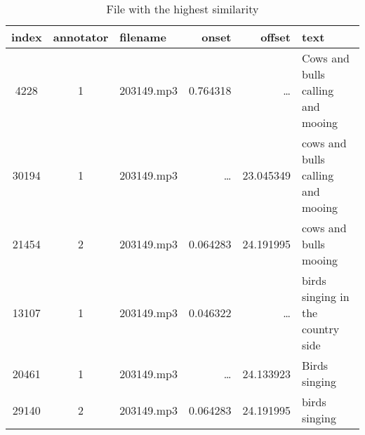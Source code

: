 \begin{table}[h]
  \caption{File with the highest similarity}
  \label{tab:highest similarity}
  \centering
  \begin{tabular}{cclrrp{6cm}}
    \toprule
    index & annotator & filename & onset & offset & text \\
    \midrule
    4228 & 1 & 203149.mp3 & 0.764318 & \dots & Cows and bulls calling and mooing \\
    30194 & 1 & 203149.mp3 & \dots & 23.045349 & cows and bulls calling and mooing \\
    21454 & 2 & 203149.mp3 & 0.064283 & 24.191995 & cows and bulls mooing \\
    13107 & 1 & 203149.mp3 & 0.046322 & \dots & birds singing in the country side \\
    20461 & 1 & 203149.mp3 & \dots & 24.133923 & Birds singing \\
    29140 & 2 & 203149.mp3 & 0.064283 & 24.191995 & birds singing \\
    \bottomrule
  \end{tabular}
\end{table}


